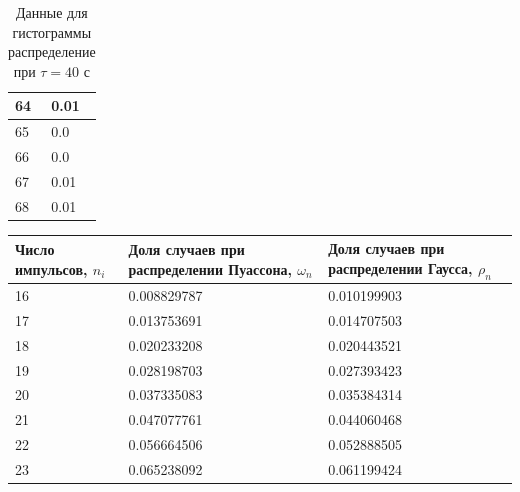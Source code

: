 \documentclass[a4paper]{article}
\begin{document}
\begin{table}[!h]
\begin{center}
\begin{tabular}{|l|l|}
64                       & 0.01                       \\\hline
65                       & 0.0                        \\\hline
66                       & 0.0                        \\\hline
67                       & 0.01                       \\\hline
68                       & 0.01                      \\\hline
\end{tabular}
\caption{Данные для гистограммы распределение при $\tau = 40$ с}
\end{center}
\end{table}

\begin{table}[!h]
\begin{center}
\begin{tabular}{|l|l|l|}
\hline
Число импульсов, $n_{i}$ & Доля случаев при распределении Пуассона, $\omega_{n}$ & Доля случаев при распределении Гаусса, $\rho_{n}$ \\ \hline
16                       & 0.008829787                                           & 0.010199903                                       \\ \hline
17                       & 0.013753691                                           & 0.014707503                                       \\ \hline
18                       & 0.020233208                                           & 0.020443521                                       \\ \hline
19                       & 0.028198703                                           & 0.027393423                                       \\ \hline
20                       & 0.037335083                                           & 0.035384314                                       \\ \hline
21                       & 0.047077761                                           & 0.044060468                                       \\ \hline
22                       & 0.056664506                                           & 0.052888505                                       \\ \hline
23                       & 0.065238092                                           & 0.061199424                                       \\ \hline

\end{tabular}
\end{center}
\end{table}
\end{document}
